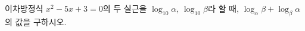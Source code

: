 이차방정식 $x^2-5x+3=0$의 두 실근을 $\log_{10} \alpha$, $\log_{10} \beta$라 할 때, $\log_\alpha \beta+\log_\beta \alpha$의 값을 구하시오.
